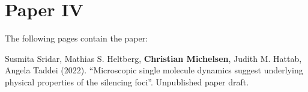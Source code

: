 
\chapter{Paper IV}
\label{chapter:diffusion}

The following  pages contain the paper:
\vspace*{1cm}


Susmita Sridar, Mathias S. Heltberg, \textbf{Christian Michelsen}, Judith M. Hattab, Angela Taddei (2022). ``Microscopic single molecule dynamics suggest underlying physical properties of the silencing foci''. Unpublished paper draft.

\clearpage
